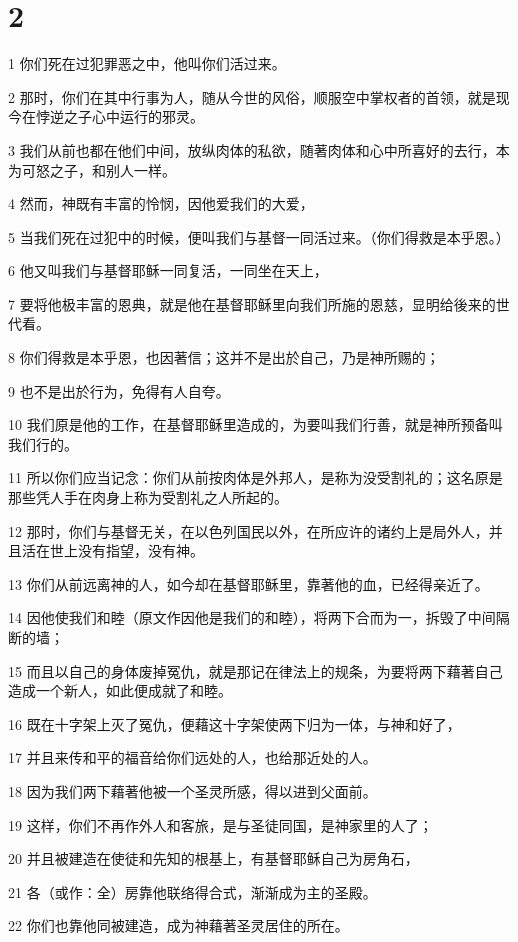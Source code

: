 \chapter{2}

\par 1 你们死在过犯罪恶之中，他叫你们活过来。
\par 2 那时，你们在其中行事为人，随从今世的风俗，顺服空中掌权者的首领，就是现今在悖逆之子心中运行的邪灵。
\par 3 我们从前也都在他们中间，放纵肉体的私欲，随著肉体和心中所喜好的去行，本为可怒之子，和别人一样。
\par 4 然而，神既有丰富的怜悯，因他爱我们的大爱，
\par 5 当我们死在过犯中的时候，便叫我们与基督一同活过来。（你们得救是本乎恩。）
\par 6 他又叫我们与基督耶稣一同复活，一同坐在天上，
\par 7 要将他极丰富的恩典，就是他在基督耶稣里向我们所施的恩慈，显明给後来的世代看。
\par 8 你们得救是本乎恩，也因著信；这并不是出於自己，乃是神所赐的；
\par 9 也不是出於行为，免得有人自夸。
\par 10 我们原是他的工作，在基督耶稣里造成的，为要叫我们行善，就是神所预备叫我们行的。
\par 11 所以你们应当记念：你们从前按肉体是外邦人，是称为没受割礼的；这名原是那些凭人手在肉身上称为受割礼之人所起的。
\par 12 那时，你们与基督无关，在以色列国民以外，在所应许的诸约上是局外人，并且活在世上没有指望，没有神。
\par 13 你们从前远离神的人，如今却在基督耶稣里，靠著他的血，已经得亲近了。
\par 14 因他使我们和睦（原文作因他是我们的和睦），将两下合而为一，拆毁了中间隔断的墙；
\par 15 而且以自己的身体废掉冤仇，就是那记在律法上的规条，为要将两下藉著自己造成一个新人，如此便成就了和睦。
\par 16 既在十字架上灭了冤仇，便藉这十字架使两下归为一体，与神和好了，
\par 17 并且来传和平的福音给你们远处的人，也给那近处的人。
\par 18 因为我们两下藉著他被一个圣灵所感，得以进到父面前。
\par 19 这样，你们不再作外人和客旅，是与圣徒同国，是神家里的人了；
\par 20 并且被建造在使徒和先知的根基上，有基督耶稣自己为房角石，
\par 21 各（或作：全）房靠他联络得合式，渐渐成为主的圣殿。
\par 22 你们也靠他同被建造，成为神藉著圣灵居住的所在。

